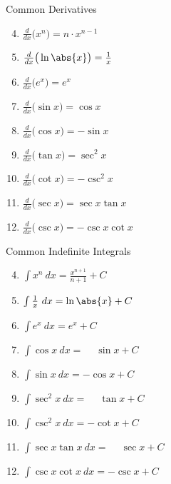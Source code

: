{\begin{minipage}[t]{.5\specialboxlength}
Common Derivatives
\begin{enumerate}
\setcounter{enumi}{3}
\item\label{thm:d_power_rule} $\frac{d}{dx}\big(x^n \big) = n\cdot x^{n-1}$\myrule
\item\label{thm:d_ln_rule} $\frac{d}{dx}\big(\ln\abs{x}\big) = \frac1 x$\myrule
\item $\frac{d}{dx}\big(e^ x \big) = e^x$\myrule
\item $\frac{d}{dx}\big(\sin x \big) = \cos x$\myrule
\item $\frac{d}{dx}\big(\cos x \big) = -\sin x$\myrule
\item $\frac{d}{dx}\big(\tan x \big) = \sec^2 x$\myrule
\item $\frac{d}{dx}\big(\cot x \big) = -\csc^2 x$\myrule
\item $\frac{d}{dx}\big(\sec x \big) = \sec x\tan x$\myrule
\item $\frac{d}{dx}\big(\csc x \big) = -\csc x\cot x$\myrule
\end{enumerate}
\end{minipage}%
%
\begin{minipage}[t]{.5\specialboxlength}
Common Indefinite Integrals
\begin{enumerate}
\setcounter{enumi}{3}
\item $\int x^n\ dx =\frac{x^{n+1}}{n+1}+ C$\myrule
\item $\int \frac{1}x\ dx = \ln\abs{x}+C$\myrule
\item $\int e^x\ dx = e^x+C$\myrule
\item $\int \cos x\ dx = \phantom{-}\sin x+C$\myrule
\item $\int \sin x\ dx = -\cos x+C$\myrule
\item $\int \sec^2 x\ dx = \phantom{-}\tan x+C$\myrule
\item $\int \csc^2 x\ dx = -\cot x+C$\myrule
\item $\int \sec x\tan x\ dx = \phantom{-}\sec x+C$\myrule
\item $\int \csc x\cot  x\ dx = -\csc x+C$\myrule
\end{enumerate}
\end{minipage}
}

